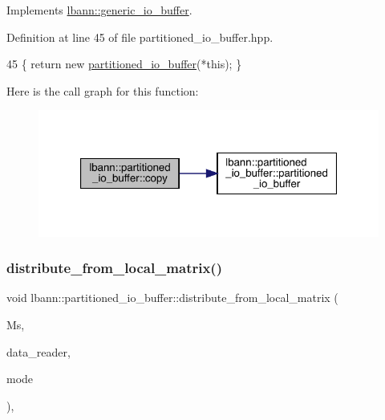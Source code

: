 Implements \hyperlink{classlbann_1_1generic__io__buffer_a9d8020b82cf467c9148b0b37e7229262}{lbann\+::generic\+\_\+io\+\_\+buffer}.



Definition at line 45 of file partitioned\+\_\+io\+\_\+buffer.\+hpp.


\begin{DoxyCode}
45 \{ \textcolor{keywordflow}{return} \textcolor{keyword}{new} \hyperlink{classlbann_1_1partitioned__io__buffer_a2dd39b740a3c0ea613cef9540d3c3e5d}{partitioned\_io\_buffer}(*\textcolor{keyword}{this}); \}
\end{DoxyCode}
Here is the call graph for this function\+:\nopagebreak
\begin{figure}[H]
\begin{center}
\leavevmode
\includegraphics[width=321pt]{classlbann_1_1partitioned__io__buffer_afce1a8859516dfaa482159806b75c263_cgraph}
\end{center}
\end{figure}
\mbox{\label{classlbann_1_1partitioned__io__buffer_a906b8b13a8b9a9e8080d4e4d4bba25bc}} 
\subsubsection{\texorpdfstring{distribute\+\_\+from\+\_\+local\+\_\+matrix()}{distribute\_from\_local\_matrix()}}
{\footnotesize\ttfamily void lbann\+::partitioned\+\_\+io\+\_\+buffer\+::distribute\+\_\+from\+\_\+local\+\_\+matrix (\begin{DoxyParamCaption}\item[{\hyperlink{base_8hpp_a9a697a504ae84010e7439ffec862b470}{Abs\+Dist\+Mat} \&}]{Ms,  }\item[{\hyperlink{classlbann_1_1generic__data__reader}{generic\+\_\+data\+\_\+reader} $\ast$}]{data\+\_\+reader,  }\item[{\hyperlink{base_8hpp_a2781a159088df64ed7d47cc91c4dc0a8}{execution\+\_\+mode}}]{mode }\end{DoxyParamCaption})\hspace{0.3cm}{\ttfamily [override]}, {\ttfamily [virtual]}}

